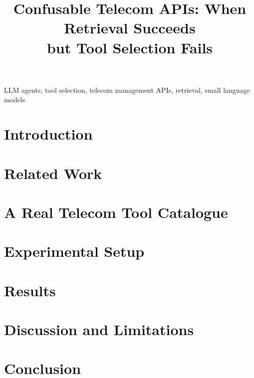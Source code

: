 \documentclass[conference]{IEEEtran}
\begin{document}
\title{Confusable Telecom APIs: When Retrieval Succeeds\\but Tool Selection Fails}

\author{
\and
{}
\and
{}
}

\maketitle

\begin{abstract}

\end{abstract}

\begin{IEEEkeywords}
LLM agents, tool selection, telecom management APIs, retrieval, small language models
\end{IEEEkeywords}

\section{Introduction}


\section{Related Work}


\section{A Real Telecom Tool Catalogue}


\section{Experimental Setup}


\section{Results}




\section{Discussion and Limitations}


\section{Conclusion}


\balance
{\scriptsize

}
\end{document}
